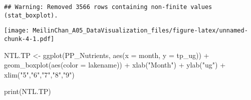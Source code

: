 \documentclass[
]{article}
\newenvironment{Shaded}{\begin{snugshade}}{\end{snugshade}}
\newcommand{\AttributeTok}[1]{\textcolor[rgb]{0.77,0.63,0.00}{#1}}
\newcommand{\CommentTok}[1]{\textcolor[rgb]{0.56,0.35,0.01}{\textit{#1}}}
\newcommand{\FunctionTok}[1]{\textcolor[rgb]{0.00,0.00,0.00}{#1}}
\newcommand{\NormalTok}[1]{#1}
\newcommand{\OtherTok}[1]{\textcolor[rgb]{0.56,0.35,0.01}{#1}}
\newcommand{\SpecialCharTok}[1]{\textcolor[rgb]{0.00,0.00,0.00}{#1}}
\newcommand{\StringTok}[1]{\textcolor[rgb]{0.31,0.60,0.02}{#1}}
\begin{document}
\begin{Shaded}
\end{Shaded}

\begin{verbatim}
## Warning: Removed 3566 rows containing non-finite values (stat_boxplot).
\end{verbatim}

\texttt{[image: MeilinChan\_A05\_DataVisualization\_files/figure-latex/unnamed-chunk-4-1.pdf]}

\begin{Shaded}
\begin{Highlighting}[]
\NormalTok{NTL.TP }\OtherTok{\textless{}{-}} \FunctionTok{ggplot}\NormalTok{(PP\_Nutrients, }\FunctionTok{aes}\NormalTok{(}\AttributeTok{x =}\NormalTok{ month, }\AttributeTok{y =}\NormalTok{ tp\_ug)) }\SpecialCharTok{+}
  \FunctionTok{geom\_boxplot}\NormalTok{(}\FunctionTok{aes}\NormalTok{(}\AttributeTok{color =}\NormalTok{ lakename)) }\SpecialCharTok{+}
  \FunctionTok{xlab}\NormalTok{(}\StringTok{"Month"}\NormalTok{) }\SpecialCharTok{+}
  \FunctionTok{ylab}\NormalTok{(}\StringTok{"ug"}\NormalTok{) }\SpecialCharTok{+}
  \FunctionTok{xlim}\NormalTok{(}\StringTok{"5"}\NormalTok{,}\StringTok{"6"}\NormalTok{,}\StringTok{"7"}\NormalTok{,}\StringTok{"8"}\NormalTok{,}\StringTok{"9"}\NormalTok{)}

\FunctionTok{print}\NormalTok{(NTL.TP)}
\end{Highlighting}
\end{Shaded}
\end{document}

